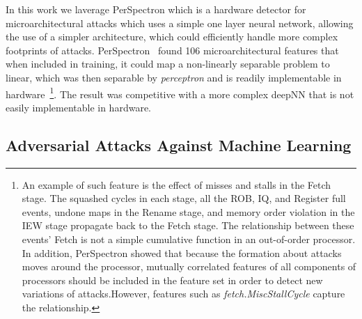 In this work we laverage PerSpectron which is a  hardware detector for microarchitectural attacks which uses a simple one layer neural network,  allowing the use of a simpler architecture, which could efficiently 
handle more complex footprints of attacks.
PerSpectron~\cite{PerSpectron} found 106 microarchitectural features that when included in training, it could map a non-linearly separable problem to linear, which was then 
separable by {\em perceptron} and is readily implementable in hardware~\footnote{An example of such feature is the effect of misses and stalls 
in the Fetch stage. The squashed cycles in each stage, all the ROB, IQ, and 
Register full events, undone maps in the Rename stage, and memory order 
violation in the IEW stage propagate back to the Fetch stage. The relationship 
between these events' Fetch is not a simple cumulative function in an out-of-order 
processor. In addition, PerSpectron showed that because the formation about attacks moves around the
processor, mutually correlated features of all components of processors should be included in the feature set in order to detect new variations of attacks.However, features such as \textit{fetch.MiscStallCycle} capture the 
relationship.}. The result was competitive 
with a more complex deepNN that is not easily implementable in hardware.




\subsection{Adversarial Attacks Against Machine Learning}


